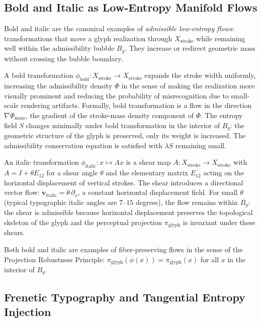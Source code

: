 \documentclass[12pt, a4paper]{article}
\theoremstyle{essaystyle}
\begin{document}
\subsection{Bold and Italic as Low-Entropy Manifold Flows}

Bold and italic are the canonical examples of \emph{admissible low-entropy flows}:
transformations that move a glyph realization through $X_{\mathrm{stroke}}$ while
remaining well within the admissibility bubble $B_g$. They increase or redirect
geometric mass without crossing the bubble boundary.

A bold transformation $\phi_{\mathrm{bold}} : X_{\mathrm{stroke}} \to X_{\mathrm{stroke}}$
expands the stroke width uniformly, increasing the admissibility density $\Phi$ in the
sense of making the realization more visually prominent and reducing the probability of
misrecognition due to small-scale rendering artifacts. Formally, bold transformation
is a flow in the direction $\nabla\Phi_{\mathrm{mass}}$, the gradient of the stroke-mass
density component of $\Phi$. The entropy field $S$ changes minimally under bold
transformation in the interior of $B_g$: the geometric structure of the glyph is
preserved, only its weight is increased. The admissibility conservation equation is
satisfied with $\lambda S$ remaining small.

An italic transformation $\phi_{\mathrm{italic}} : x \mapsto Ax$ is a shear map
$A : X_{\mathrm{stroke}} \to X_{\mathrm{stroke}}$ with $A = I + \theta E_{12}$ for
a shear angle $\theta$ and the elementary matrix $E_{12}$ acting on the horizontal
displacement of vertical strokes. The shear introduces a directional vector flow:
$\mathbf{v}_{\mathrm{italic}} = \theta\,\partial_x$, a constant horizontal displacement
field. For small $\theta$ (typical typographic italic angles are $7$--$15$ degrees),
the flow remains within $B_g$: the shear is admissible because horizontal displacement
preserves the topological skeleton of the glyph and the perceptual projection
$\pi_{\mathrm{glyph}}$ is invariant under these shears.

Both bold and italic are examples of fiber-preserving flows in the sense of the
Projection Robustness Principle: $\pi_{\mathrm{glyph}}(\phi(x)) = \pi_{\mathrm{glyph}}(x)$
for all $x$ in the interior of $B_g$.

\subsection{Frenetic Typography and Tangential Entropy Injection}
\end{document}
